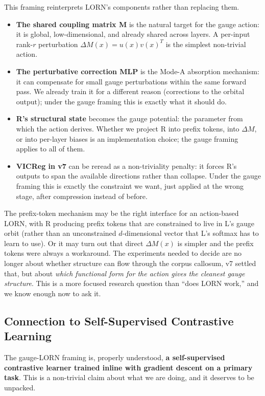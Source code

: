 \documentclass[11pt, a4paper]{article}
\theoremstyle{plain}
\theoremstyle{definition}
\theoremstyle{remark}
\begin{document}
This framing reinterprets LORN's components rather than replacing them.
\begin{itemize}[nosep]
\item \textbf{The shared coupling matrix M} is the natural target for the gauge action: it is global, low-dimensional, and already shared across layers. A per-input rank-$r$ perturbation $\Delta M(x) = u(x) v(x)^T$ is the simplest non-trivial action.
\item \textbf{The perturbative correction MLP} is the Mode-A absorption mechanism: it can compensate for small gauge perturbations within the same forward pass. We already train it for a different reason (corrections to the orbital output); under the gauge framing this is exactly what it should do.
\item \textbf{R's structural state} becomes the gauge potential: the parameter from which the action derives. Whether we project R into prefix tokens, into $\Delta M$, or into per-layer biases is an implementation choice; the gauge framing applies to all of them.
\item \textbf{VICReg in v7} can be reread as a non-triviality penalty: it forces R's outputs to span the available directions rather than collapse. Under the gauge framing this is exactly the constraint we want, just applied at the wrong stage, after compression instead of before.
\end{itemize}

The prefix-token mechanism may be the right interface for an action-based LORN, with R producing prefix tokens that are constrained to live in L's gauge orbit (rather than an unconstrained $d$-dimensional vector that L's softmax has to learn to use).
Or it may turn out that direct $\Delta M(x)$ is simpler and the prefix tokens were always a workaround.
The experiments needed to decide are no longer about whether structure can flow through the corpus callosum, v7 settled that, but about \emph{which functional form for the action gives the cleanest gauge structure}.
This is a more focused research question than ``does LORN work,'' and we know enough now to ask it.

\subsection{Connection to Self-Supervised Contrastive Learning}
\label{sec:gauge-ssl}

The gauge-LORN framing is, properly understood, \textbf{a self-supervised contrastive learner trained inline with gradient descent on a primary task}. This is a non-trivial claim about what we are doing, and it deserves to be unpacked.
\end{document}
